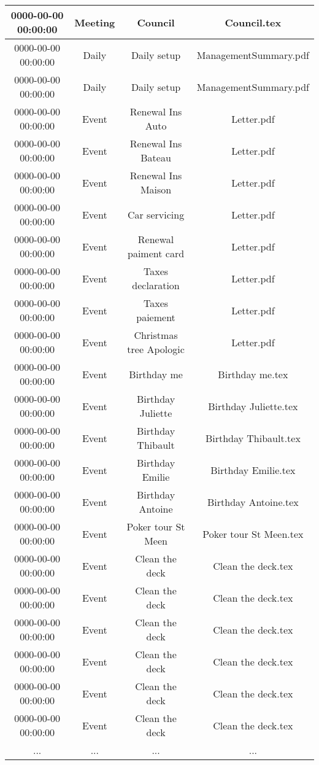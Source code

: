 \begin{longtable}{|c|c|c|c|}
\hline
0000-00-00 00:00:00 & Meeting & Council & Council.tex\\
\hline
0000-00-00 00:00:00 & Daily & Daily setup & ManagementSummary.pdf\\
\hline
0000-00-00 00:00:00 & Daily & Daily setup & ManagementSummary.pdf\\
\hline
0000-00-00 00:00:00 & Event & Renewal Ins Auto & Letter.pdf\\
\hline
0000-00-00 00:00:00 & Event & Renewal Ins Bateau & Letter.pdf\\
\hline
0000-00-00 00:00:00 & Event & Renewal Ins Maison & Letter.pdf\\
\hline
0000-00-00 00:00:00 & Event & Car servicing & Letter.pdf\\
\hline
0000-00-00 00:00:00 & Event & Renewal paiment card & Letter.pdf\\
\hline
0000-00-00 00:00:00 & Event & Taxes declaration & Letter.pdf\\
\hline
0000-00-00 00:00:00 & Event & Taxes paiement & Letter.pdf\\
\hline
0000-00-00 00:00:00 & Event & Christmas tree Apologic & Letter.pdf\\
\hline
0000-00-00 00:00:00 & Event & Birthday me & Birthday me.tex\\
\hline
0000-00-00 00:00:00 & Event & Birthday Juliette & Birthday Juliette.tex\\
\hline
0000-00-00 00:00:00 & Event & Birthday Thibault & Birthday Thibault.tex\\
\hline
0000-00-00 00:00:00 & Event & Birthday Emilie & Birthday Emilie.tex\\
\hline
0000-00-00 00:00:00 & Event & Birthday Antoine & Birthday Antoine.tex\\
\hline
0000-00-00 00:00:00 & Event & Poker tour St Meen & Poker tour St Meen.tex\\
\hline
0000-00-00 00:00:00 & Event & Clean the deck & Clean the deck.tex\\
\hline
0000-00-00 00:00:00 & Event & Clean the deck & Clean the deck.tex\\
\hline
0000-00-00 00:00:00 & Event & Clean the deck & Clean the deck.tex\\
\hline
0000-00-00 00:00:00 & Event & Clean the deck & Clean the deck.tex\\
\hline
0000-00-00 00:00:00 & Event & Clean the deck & Clean the deck.tex\\
\hline
0000-00-00 00:00:00 & Event & Clean the deck & Clean the deck.tex\\
\hline
 ... & ... & ... & ... \\
\hline
\hline
\end{longtable}
